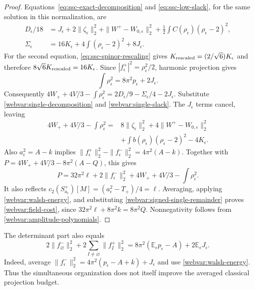 \begin{proof}
Equations~\eqref{eq:ssc-exact-decomposition} and
\eqref{eq:ssc-low-slack}, for the same solution in this normalization, are
\begin{align}
 D_\epsilon/18
 &=J_\epsilon+2\|\zeta_\epsilon\|_2^2+\|W^+-W_{0,\epsilon}\|_2^2
       +\tfrac12\int C(\rho_\epsilon)(\rho_\epsilon-2)^2,
       \label{webvar:single-decomposition}\\
 \Sigma_\epsilon
 &=16K_\epsilon+4\int(\rho_\epsilon-2)^2+8J_\epsilon.
       \label{webvar:single-slack}
\end{align}
For the second equation, \eqref{eq:ssc-spinor-rescaling} gives
$K_{\rm rescaled}=(2/\sqrt6)K_\epsilon$ and therefore
$8\sqrt6K_{\rm rescaled}=16K_\epsilon$.
Since $|f_\epsilon^+|^2=\rho_\epsilon^2/2$, harmonic projection gives
\begin{equation}\label{webvar:spinor-hodge}
 \int\rho_\epsilon^2=8\pi^2p_\epsilon+2J_\epsilon.
\end{equation}
Consequently
$4W_++4V/3-\int\rho_\epsilon^2
 =2D_\epsilon/9-\Sigma_\epsilon/4-2J_\epsilon$.
Substitute \eqref{webvar:single-decomposition} and
\eqref{webvar:single-slack}.  The $J_\epsilon$ terms cancel, leaving
\begin{equation}\label{webvar:signed-single-remainder}
 \begin{split}
 4W_++4V/3-\int\rho_\epsilon^2
  ={}&8\|\zeta_\epsilon\|_2^2+4\|W^+-W_{0,\epsilon}\|_2^2\\
    &+\int b(\rho_\epsilon)(\rho_\epsilon-2)^2-4K_\epsilon.
 \end{split}
\end{equation}
Also $a_\epsilon^2=A-k$ implies
$\|f_\epsilon^+\|_2^2-\|f_\epsilon^-\|_2^2=4\pi^2(A-k)$.
Together with $P=4W_++4V/3-8\pi^2(A-Q)$, this gives
\begin{equation}\label{webvar:chern-single-cost}
 P=32\pi^2\ell+2\|f_\epsilon^-\|_2^2
                    +4W_++4V/3-\int\rho_\epsilon^2.
\end{equation}
It also reflects $c_2(S^+_{a_\epsilon})[M]=(a_\epsilon^2-T_+)/4=\ell$.
Averaging, applying \eqref{webvar:walsh-energy}, and substituting
\eqref{webvar:signed-single-remainder} proves \eqref{webvar:field-cost},
since $32\pi^2\ell+8\pi^2k=8\pi^2Q$.
Nonnegativity follows from \eqref{webvar:amplitude-polynomials}.
\end{proof}

The determinant part also equals
\begin{equation}\label{webvar:walsh-classical-comparison}
 2\|f_\varnothing^-\|_2^2+2\sum_{I\ne\varnothing}\|f_I^+\|_2^2
 =8\pi^2(\mathbb E_\epsilon p_\epsilon-A)
                                  +2\mathbb E_\epsilon J_\epsilon.
\end{equation}
Indeed, average
$\|f_\epsilon^-\|_2^2=4\pi^2(p_\epsilon-A+k)+J_\epsilon$
and use \eqref{webvar:walsh-energy}.  Thus the simultaneous organization
does not itself improve the averaged classical projection budget.

